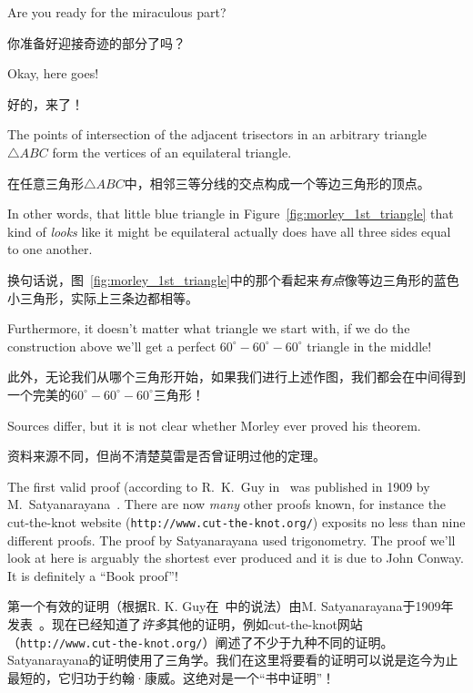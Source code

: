 Are you ready for the miraculous part?

你准备好迎接奇迹的部分了吗？

Okay, here goes!

好的，来了！

\begin{thm}
The points of intersection of the adjacent trisectors in an arbitrary
triangle ${\triangle}ABC$ form the vertices of an equilateral triangle.
\end{thm}

\begin{thm}
在任意三角形${\triangle}ABC$中，相邻三等分线的交点构成一个等边三角形的顶点。
\end{thm}

In other words, that little blue triangle in 
Figure~\ref{fig:morley_1st_triangle}
that kind of \emph{looks} like it might be equilateral actually does have
all three sides equal to one another.

换句话说，图~\ref{fig:morley_1st_triangle}中的那个看起来\emph{有点}像等边三角形的蓝色小三角形，实际上三条边都相等。

Furthermore, it doesn't matter what
triangle we start with, if we do the construction above we'll get
a perfect $60^\circ - 60^\circ - 60^\circ$ triangle in the middle!

此外，无论我们从哪个三角形开始，如果我们进行上述作图，我们都会在中间得到一个完美的$60^\circ - 60^\circ - 60^\circ$三角形！

Sources differ, but it is not clear whether Morley ever proved his 
theorem.

资料来源不同，但尚不清楚莫雷是否曾证明过他的定理。

The first valid proof (according to R.\ K.\ Guy in~\cite{lighthouse}
was published in 1909 by M.\ Satyanarayana~\cite{satyana}.  There are now
\emph{many} other proofs known, for instance the cut-the-knot website
(\verb+http://www.cut-the-knot.org/+) exposits no less than nine different
proofs.  The proof by Satyanarayana used trigonometry.  The proof we'll
look at here is arguably the shortest ever produced and it is due to
John Conway.  It is definitely a ``Book proof''!

第一个有效的证明（根据R. K. Guy在~\cite{lighthouse}中的说法）由M. Satyanarayana于1909年发表~\cite{satyana}。现在已经知道了\emph{许多}其他的证明，例如cut-the-knot网站（\verb+http://www.cut-the-knot.org/+）阐述了不少于九种不同的证明。Satyanarayana的证明使用了三角学。我们在这里将要看的证明可以说是迄今为止最短的，它归功于约翰·康威。这绝对是一个“书中证明”！

